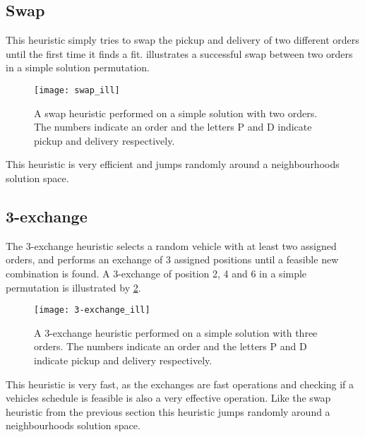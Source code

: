 \documentclass[../main.tex]{subfiles}
\begin{document}
\subsection{Swap}
\label{sec:swap}
This heuristic simply tries to swap the pickup and delivery of two different orders until the first time it finds a fit. 
 illustrates a successful swap between two orders in a simple solution permutation. 

\begin{figure}                                                                    
    \centering                                                                                     
    \texttt{[image: swap\_ill]}                                     
    \caption{A swap heuristic performed on a simple solution with two orders. The numbers indicate an order and the letters P and D indicate pickup and delivery respectively.}
    \label{fig:swap}
\end{figure}

This heuristic is very efficient and jumps randomly around a neighbourhoods solution space.

\subsection{3-exchange}
\label{sec:exch}
The 3-exchange heuristic selects a random vehicle with at least two assigned orders, and performs an exchange of 3 assigned positions until a feasible new combination is found. A 3-exchange of position 2, 4 and 6 in a simple permutation is illustrated by \cref{fig:exch}. \newline

\begin{figure}                                                                                     
    \centering                                                                                     
    \texttt{[image: 3-exchange\_ill]}                                     
    \caption{A 3-exchange heuristic performed on a simple solution with three orders. The numbers indicate an order and the letters P and D indicate pickup and delivery respectively.}
    \label{fig:exch}                                                                            
\end{figure}

This heuristic is very fast, as the exchanges are fast operations and checking if a vehicles schedule is feasible is also a very effective operation. Like the swap heuristic from the previous section this heuristic jumps randomly around a neighbourhoods solution space.
\end{document}
